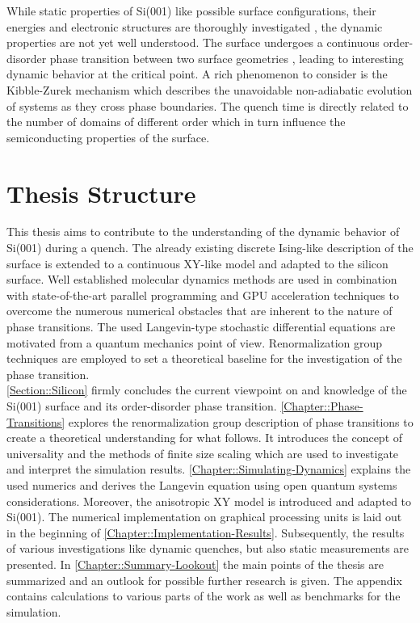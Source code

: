 	While static properties of Si(001) like possible surface configurations, their energies and electronic structures are thoroughly investigated \cite{ramstad1995theoretical, pillay2004revisit, matsumoto2003low, tochihara1994low}, the dynamic properties\cite{schaller2023sequential} are not yet well understood. The surface undergoes a continuous order-disorder phase transition between two surface geometries \cite{tabata1987order}, leading to interesting dynamic behavior at the critical point. A rich phenomenon to consider is the Kibble-Zurek mechanism\cite{kibble1976topology, zurek1985cosmological, zurek1996cosmological} which describes the unavoidable non-adiabatic evolution of systems as they cross phase boundaries. The quench time is directly related to the number of domains of different order which in turn influence the semiconducting \cite{himpsel1979photoemission, uhrberg1981experimental, handa1989plasma} properties of the surface. \\
	
	\section{Thesis Structure}
	This thesis aims to contribute to the understanding of the dynamic behavior of Si(001) during a quench. The already existing discrete Ising-like description of the surface is extended to a continuous XY-like model and adapted to the silicon surface. Well established molecular dynamics methods are used in combination with state-of-the-art parallel programming and GPU acceleration techniques to overcome the numerous numerical obstacles that are inherent to the nature of phase transitions. The used Langevin-type stochastic differential equations are motivated from a quantum mechanics point of view. Renormalization group techniques are employed to set a theoretical baseline for the investigation of the phase transition. \\
	
	\autoref{Section::Silicon} firmly concludes the current viewpoint on and knowledge of the Si(001) surface and its order-disorder phase transition. \autoref{Chapter::Phase-Transitions} explores the renormalization group description of phase transitions to create a theoretical understanding for what follows. It introduces the concept of universality and the methods of finite size scaling which are used to investigate and interpret the simulation results.  \autoref{Chapter::Simulating-Dynamics} explains the used numerics and derives the Langevin equation using open quantum systems considerations. Moreover, the anisotropic XY model is introduced and adapted to Si(001). The numerical implementation on graphical processing units is laid out in the beginning of \autoref{Chapter::Implementation-Results}. Subsequently, the results of various investigations like dynamic quenches, but also static measurements are presented. In \autoref{Chapter::Summary-Lookout} the main points of the thesis are summarized and an outlook for possible further research is given. The appendix contains calculations to various parts of the work as well as benchmarks for the simulation. \\

